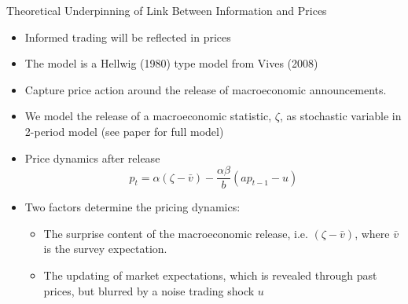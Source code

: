 \documentclass[final]{beamer}
\begin{document}
\begin{frame}
\begin{columns}[t]
\begin{column}{.43 \linewidth}
\begin{block}{Theoretical Underpinning of Link Between Information and Prices}
\begin{itemize}

\item Informed trading will be reflected in prices

\item The model is a Hellwig (1980) type model from Vives (2008)

\item Capture price action around the release of macroeconomic announcements.

\item We model the release of a macroeconomic statistic, $\zeta$, as stochastic variable in 2-period model (see paper for full model)

\item Price dynamics after release
\[
p_{t}=\alpha \left( \zeta -\bar{v}\right) -\frac{\alpha \beta }{b}\left(ap_{t-1}-u\right)
\]

\item Two factors determine the pricing dynamics:
\begin{itemize}

\item The surprise content of the macroeconomic release, i.e. $\left( \zeta -\bar{v}\right)$, where $\bar{v}$ is the survey expectation.

\item The updating of market expectations, which is revealed through past prices, but blurred by a noise trading shock $u$

\end{itemize}

\end{itemize}

\end{block}%

\vspace{.4 cm}%


\end{column}
\end{columns}
\end{frame}
\end{document}
